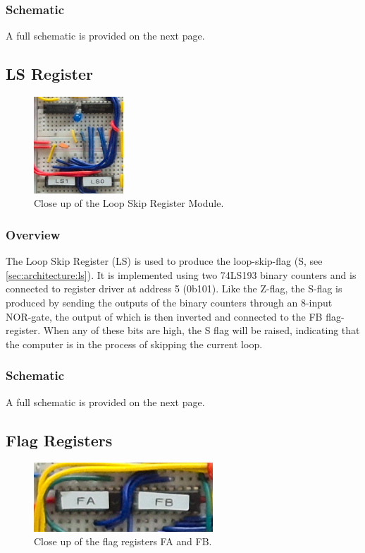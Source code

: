 \subsubsection{Schematic}
A full schematic is provided on the next page.




\subsection{LS Register}
\begin{figure}[H]
  \centering
  \includegraphics[width=0.3\textwidth]{img/lsregistercloseup}
  \caption{Close up of the Loop Skip Register Module.}
  \label{fig:spregcloseup}
\end{figure}

\subsubsection{Overview}
The Loop Skip Register (LS) is used to produce the loop-skip-flag (S, see \ref{sec:architecture:ls}). It is implemented using two 74LS193 binary counters and is connected to register driver at address 5 (0b101). Like the Z-flag, the S-flag is produced by sending the outputs of the binary counters through an 8-input NOR-gate, the output of which is then inverted and connected to the FB flag-register. When any of these bits are high, the S flag will be raised, indicating that the computer is in the process of skipping the current loop.


\subsubsection{Schematic}
A full schematic is provided on the next page.




\subsection{Flag Registers}
\begin{figure}[H]
  \centering
  \includegraphics[width=0.6\textwidth]{img/flagregistercloseup}
  \caption{Close up of the flag registers FA and FB.}
  \label{fig:ramcloseup}
\end{figure}

